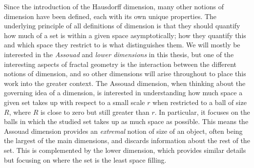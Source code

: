 Since the introduction of the Hausdorff dimension, many other notions of dimension have been defined, each with its own unique properties. The underlying principle of all definitions of dimension is that they should quantify how much of a set is within a given space asymptotically; how they quantify this and which space they restrict to is what distinguishes them. We will mostly be interested in the \textit{Assouad} and \textit{lower dimensions} in this thesis, but one of the interesting aspects of fractal geometry is the interaction between the different notions of dimension, and so other dimensions will arise throughout to place this work into the greater context. The Assouad dimension, when thinking about the governing idea of a dimension, is interested in understanding how much space a given set takes up with respect to a small scale $r$ when restricted to a ball of size $R$, where $R$ is close to zero but still greater than $r$. In particular, it focuses on the balls in which the studied set takes up as much space as possible. This means the Assouad dimension provides an \textit{extremal} notion of size of an object, often being the largest of the main dimensions, and discards information about the rest of the set. This is complemented by the lower dimension, which provides similar details but focusing on where the set is the least space filling.  



